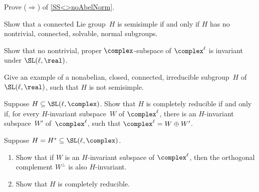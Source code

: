 \begin{exercises}

\item \label{SS->Nnotabel}
 Prove ($\Rightarrow$) of \cref{SS<>noAbelNorm}.

\item \label{SS<>Nnotsolv}
 Show that a connected Lie group~$H$ is semisimple if and
only if $H$ has no nontrivial, connected, solvable, normal
subgroups.

\item \label{SLnRIrred}
 Show that no nontrivial, proper $\complex$-subspace of
$\complex^\ell$ is invariant under $\SL(\ell,\real)$.

\item Give an example of a nonabelian, closed, connected,
irreducible subgroup~$H$ of $\SL(\ell,\real)$, such that $H$ is
not semisimple. 

\item Suppose $H \subseteq \SL(\ell,\complex)$. Show that $H$
is completely reducible if and only if, for every
$H$-invariant subspace~$W$ of $\complex^\ell$, there is an
$H$-invariant subspace~$W'$ of~$\complex^\ell$, such that
$\complex^\ell = W \oplus W'$.

\item \label{H*=H->CompRed}
 Suppose $H = H^* \subseteq \SL(\ell,\complex)$. 
 \begin{enumerate}
 \item Show that if $W$ is an $H$-invariant subspace of
$\complex^\ell$, then the orthogonal complement $W^\perp$
is also $H$-invariant.
 \item Show that $H$ is completely reducible.
 \end{enumerate}

\end{exercises}







